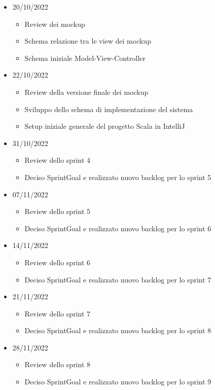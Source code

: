 \begin{itemize}
\begin{itemize}
        \end{itemize}
    \item 20/10/2022
        \begin{itemize}
            \item Review dei mockup
            \item Schema relazione tra le view dei mockup
            \item Schema iniziale Model-View-Controller
        \end{itemize}
    \item 22/10/2022
        \begin{itemize}
            \item Review della versione finale dei mockup
            \item Sviluppo dello schema di implementazione del sistema
            \item Setup iniziale generale del progetto Scala in IntelliJ
        \end{itemize}
    \item 31/10/2022
        \begin{itemize}
            \item Review dello sprint 4
            \item Deciso SprintGoal e realizzato nuovo backlog per lo sprint 5
        \end{itemize}
    \item 07/11/2022
        \begin{itemize}
            \item Review dello sprint 5
            \item Deciso SprintGoal e realizzato nuovo backlog per lo sprint 6
        \end{itemize}
    \item 14/11/2022
        \begin{itemize}
            \item Review dello sprint 6
            \item Deciso SprintGoal e realizzato nuovo backlog per lo sprint 7
        \end{itemize}
    \item 21/11/2022
        \begin{itemize}
            \item Review dello sprint 7
            \item Deciso SprintGoal e realizzato nuovo backlog per lo sprint 8
        \end{itemize}
    \item 28/11/2022
        \begin{itemize}
            \item Review dello sprint 8
            \item Deciso SprintGoal e realizzato nuovo backlog per lo sprint 9
        \end{itemize}
\end{itemize}

